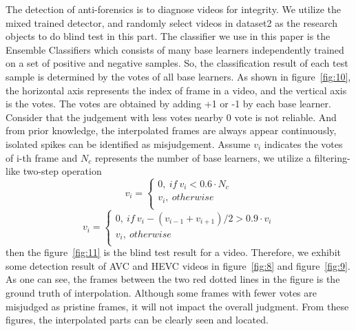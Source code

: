 \documentclass[pdftex,twocolumn,epjc3]{svjour3}          %
\begin{document}
The detection of anti-forensics is to diagnose videos for integrity. We utilize the mixed trained detector, and randomly select videos in dataset2 as the research objects to do blind test in this part. The classifier we use in this paper is the Ensemble Classifiers which consists of many base learners independently trained on a set of positive and negative samples. So, the classification result of each test sample is determined by the votes of all base learners. As shown in figure~\ref{fig:10}, the horizontal axis represents the index of frame in a video, and the vertical axis is the votes. The votes are obtained by adding +1 or -1 by each base learner. Consider that the judgement with less votes nearby 0 vote is not reliable. And from prior knowledge, the interpolated frames are always appear continuously, isolated spikes can be identified as misjudgement. Assume $v_i$ indicates the votes of i-th frame and $N_c$ represents the number of base learners, we utilize a filtering-like two-step operation
\begin{equation}
v_i=\left\{
\begin{array}{lc}
0,\  if\  v_i<0.6\cdot N_c\\
v_i,\  otherwise\\
\end{array}
\right.
\end{equation}
\begin{equation}
v_i=\left\{
\begin{array}{lc}
0,\  if\  v_i-(v_{i-1}+v_{i+1})/2>0.9\cdot v_i\\
v_i,\  otherwise\\
\end{array}
\right.
\end{equation}
then the figure~\ref{fig:11} is the blind test result for a video. Therefore, we exhibit some detection result of AVC and HEVC videos in figure~\ref{fig:8} and figure~\ref{fig:9}. As one can see, the frames between the two red dotted lines in the figure is the ground truth of interpolation. Although some frames with fewer votes are misjudged as pristine frames, it will not impact the overall judgment. From these figures, the interpolated parts can be clearly seen and located.
\end{document}
